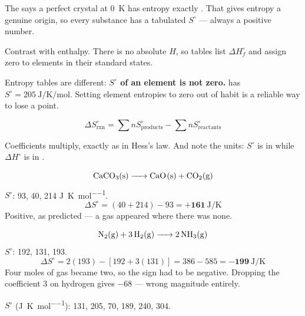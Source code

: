 \documentclass{apchem-notes}
\begin{document}


The  says a perfect crystal at
\SI{0}{\kelvin} has entropy exactly . That gives
entropy a genuine origin, so every substance has a tabulated
 $S^\circ$ --- always a positive number.

\begin{apctrap}
Contrast with enthalpy. There is no absolute $H$, so tables list
$\Delta H_f^\circ$ and assign zero to elements in their standard states.

Entropy tables are different: \textbf{$S^\circ$ of an element is not zero.}
 has $S^\circ = \SI{205}{\joule\per\kelvin\per\mole}$. Setting
element entropies to zero out of habit is a reliable way to lose a point.
\end{apctrap}

\[ \boxed{\;\Delta S^\circ_{\text{rxn}} = \sum n S^\circ_{\text{products}}
   - \sum n S^\circ_{\text{reactants}}\;} \]

Coefficients multiply, exactly as in Hess's law. And note the units:
$S^\circ$ is in  while $\Delta H^\circ$ is in
.

\begin{workedexample}
\[ \ce{CaCO3(s) -> CaO(s) + CO2(g)} \]
$S^\circ$:  93,  40,  214
\si{\joule\per\kelvin\per\mole}.
\[ \Delta S^\circ = (40 + 214) - 93 = \mathbf{+161}~\si{\joule\per\kelvin} \]
Positive, as predicted --- a gas appeared where there was none.
\end{workedexample}

\begin{workedexample}
\[ \ce{N2(g) + 3H2(g) -> 2NH3(g)} \]
$S^\circ$:  192,  131,  193.
\[ \Delta S^\circ = 2(193) - [192 + 3(131)] = 386 - 585
   = \mathbf{-199}~\si{\joule\per\kelvin} \]
Four moles of gas became two, so the sign had to be negative. Dropping the
coefficient 3 on hydrogen gives $-68$ --- wrong magnitude entirely.
\end{workedexample}


$S^\circ$ (\si{\joule\per\kelvin\per\mole}):  131,  205,
 70,  189,  240,  304.
\end{document}
